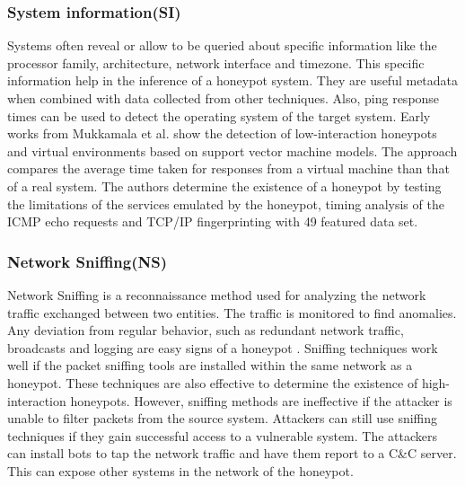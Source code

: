 \subsubsection{System information(SI)}
Systems often reveal or allow to be queried about specific information like the processor family, architecture, network interface and timezone. This specific information help in the inference of a honeypot system. They are useful metadata when combined with data collected from other techniques.  Also, ping response times can be used to detect the operating system of the target system. Early works from Mukkamala et al. \cite{mukkamala} show the detection of low-interaction honeypots and virtual environments based on support vector machine models. The approach compares the average time taken for responses from a virtual machine than that of a real system. The authors determine the existence of a honeypot by testing the limitations of the services emulated by the honeypot, timing analysis of the ICMP echo requests and TCP/IP fingerprinting with 49 featured data set.  
\newline
\subsubsection{Network Sniffing(NS)}
Network Sniffing is a reconnaissance method used for analyzing the network traffic exchanged between two entities. The traffic is monitored to find anomalies. Any deviation from regular behavior, such as redundant network traffic, broadcasts and logging are easy signs of a honeypot . Sniffing techniques work well if the packet sniffing tools are installed within the same network as a honeypot. These techniques are also effective to determine the existence of high-interaction honeypots. However, sniffing methods are ineffective if the attacker is unable to filter packets from the source system. Attackers can still use sniffing techniques if they gain successful access to a vulnerable system. The attackers can install bots to tap the network traffic and have them report to a C\&C  server. This can expose other systems in the network of the honeypot. 

